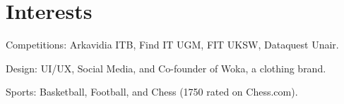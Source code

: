 \documentclass[a4paper,20pt]{article}
\begin{document}
\section{Interests}
\begin{description}[font=$\bullet$]
\item {Competitions: Arkavidia ITB, Find IT UGM, FIT UKSW, Dataquest Unair.}
\vspace{-5pt}
\item {Design: UI/UX, Social Media, and Co-founder of Woka, a clothing brand.}
\vspace{-5pt}
\item {Sports: Basketball, Football, and Chess (1750 rated on Chess.com).}

\end{description}
\end{document}
